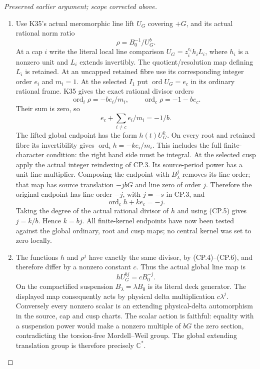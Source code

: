 \begin{proof}[Preserved earlier argument; scope corrected above]
\begin{enumerate}[label=\arabic*.]
\par

\medskip\noindent\textbf{CP.4. The global valuation equation retains the finite kernel}

\par\nobreak

\item Use K35's actual meromorphic line lift \(U_G\) covering \(+G\),
and its actual rational norm ratio
\[
                   \rho=B_0^{-1}/U_G^b.                   \tag{CP.4}
\]
At a cap \(i\) write the literal local line comparison
\(U_G=z_i^{e_i}h_iL_i\), where \(h_i\) is a nonzero unit and
\(L_i\) extends invertibly. The quotient/resolution map defining
\(L_i\) is retained. At an uncapped retained fibre use its
corresponding integer order \(e_i\) and \(m_i=1\). At the
selected \(I_1\) put \(\operatorname{ord}U_G=e_c\) in its
ordinary rational frame. K35 gives the exact rational divisor orders
\[
 \operatorname{ord}_i\rho=-be_i/m_i,
 \qquad\operatorname{ord}_c\rho=-1-be_c.
\]
Their sum is zero, so
\[
                   e_c+\sum_{i\ne c}e_i/m_i=-1/b.          \tag{CP.5}
\]
The lifted global endpoint has the form \(h(t)U_G^k\). On every
root and retained fibre its invertibility gives
\(\operatorname{ord}_i h=-ke_i/m_i\). This includes the full
finite-character condition: the right hand side must be integral.
At the selected cusp apply the actual integer reindexing of CP.3.
Its source-period power has a unit line multiplier. Composing the
endpoint with \(B_\lambda^j\) removes its line order; that map
has source translation \(-jbG\) and line zero of order \(j\).
Therefore the original endpoint has line order \(-j\), with
\(j=-s\) in CP.3, and
\[
                      \operatorname{ord}_c h+ke_c=-j.
                                                               \tag{CP.6}
\]
Taking the degree of the actual rational divisor of \(h\) and
using (CP.5) gives \(j=k/b\). Hence \(k=bj\). All finite-kernel
endpoints have now been tested against the global ordinary, root
and cusp maps; no central kernel was set to zero locally.

\item The functions \(h\) and \(\rho^j\) have exactly the same divisor,
by (CP.4)--(CP.6), and therefore differ by a nonzero constant \(c\).
Thus the actual global line map is
\[
                hU_G^{bj}=cB_0^{-j}.
\]
On the compactified suspension \(B_\lambda=\lambda B_0\) is its
literal deck generator. The displayed map consequently acts by
physical delta multiplication \(c\lambda^j\). Conversely every
nonzero scalar is an extending physical-delta automorphism in the
source, cap and cusp charts. The scalar action is faithful: equality
with a suspension power would make a nonzero multiple of \(bG\)
the zero section, contradicting the torsion-free Mordell--Weil group.
The global extending translation group is therefore precisely
\(\mathbb C^*\).


\end{enumerate}
\end{proof}
